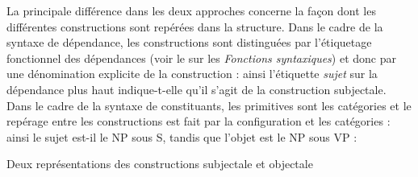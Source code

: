 {    La principale différence dans les deux approches concerne la façon dont les différentes constructions sont repérées dans la structure. Dans le cadre de la syntaxe de dépendance, les constructions sont distinguées par l’étiquetage fonctionnel des dépendances (voir le  sur les \textit{Fonctions syntaxiques}) et donc par une dénomination explicite de la construction : ainsi l’étiquette \textit{sujet} sur la dépendance plus haut indique-t-elle qu’il s’agit de la construction subjectale. Dans le cadre de la syntaxe de constituants, les primitives sont les catégories et le repérage entre les constructions est fait par la configuration et les catégories : ainsi le sujet est-il le NP sous S, tandis que l’objet est le NP sous VP :

    \ea

    Deux représentations des constructions subjectale et objectale
    \z
}
